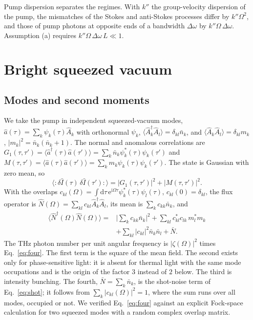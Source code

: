 \documentclass[aps,pra,reprint,superscriptaddress,amsmath,amssymb,floatfix]{revtex4-2}
\newcommand{\nbar}{\bar n}
\newcommand{\Nbar}{\bar N}
\newcommand{\Nop}{\hat N}
\newcommand{\Iop}{\hat I}
\newcommand{\dd}{\mathrm{d}}
\newcommand{\ee}{\mathrm{e}}
\newcommand{\ii}{\mathrm{i}}
\begin{document}
Pump dispersion separates the regimes. With $k''$ the group-velocity
dispersion of the pump, the mismatches of the Stokes and anti-Stokes
processes differ by $k''\Omega^2$, and those of pump photons at opposite ends
of a bandwidth $\Delta\omega$ by $k''\Omega\,\Delta\omega$. Assumption (a)
requires $k''\Omega\,\Delta\omega\,L\ll1$.

\section{Bright squeezed vacuum}
\label{sec:bsv}

\subsection{Modes and second moments}

We take the pump in independent squeezed-vacuum modes,
$\hat a(\tau)=\sum_k\psi_k(\tau)\hat A_k$ with orthonormal $\psi_k$,
$\langle\hat A_k^\dagger\hat A_l\rangle=\delta_{kl}\nbar_k$, and
$\langle\hat A_k\hat A_l\rangle=\delta_{kl}m_k$, $|m_k|^2=\nbar_k(\nbar_k+1)$.
The normal and anomalous correlations are
$G_1(\tau,\tau')=\langle\hat a^\dagger(\tau)\hat a(\tau')\rangle
=\sum_k\nbar_k\psi_k^*(\tau)\psi_k(\tau')$ and
$M(\tau,\tau')=\langle\hat a(\tau)\hat a(\tau')\rangle
=\sum_km_k\psi_k(\tau)\psi_k(\tau')$. The state is Gaussian with zero mean, so
\begin{equation}
\langle{:}\delta\Iop(\tau)\,\delta\Iop(\tau'){:}\rangle
=|G_1(\tau,\tau')|^2+|M(\tau,\tau')|^2 .
\label{eq:gmt}
\end{equation}
With the overlaps $c_{kl}(\Omega)=\int\!\dd\tau\,\ee^{\ii\Omega\tau}
\psi_k^*(\tau)\psi_l(\tau)$, $c_{kl}(0)=\delta_{kl}$, the flux operator is
$\Nop(\Omega)=\sum_{kl}c_{kl}\hat A_k^\dagger\hat A_l$, its mean is
$\sum_kc_{kk}\nbar_k$, and
\begin{align}
\langle\Nop^\dagger(\Omega)\Nop(\Omega)\rangle={}&
\Big|\sum_kc_{kk}\nbar_k\Big|^2
+\sum_{kl}c_{kl}^*c_{lk}\,m_l^*m_k\nonumber\\
&+\sum_{kl}|c_{kl}|^2\nbar_k\nbar_l+\Nbar .
\label{eq:four}
\end{align}
The THz photon number per unit angular frequency is $|\zeta(\Omega)|^2$ times
Eq.~\eqref{eq:four}. The first term is the square of the mean field. The
second exists only for phase-sensitive light: it is absent for thermal light
with the same mode occupations and is the origin of the factor $3$ instead of
$2$ below. The third is intensity bunching. The fourth,
$\Nbar=\sum_k\nbar_k$, is the shot-noise term of Eq.~\eqref{eq:shot}; it
follows from $\sum_k|c_{kl}(\Omega)|^2=1$, where the sum runs over all modes,
occupied or not. We verified Eq.~\eqref{eq:four} against an explicit
Fock-space calculation for two squeezed modes with a random complex overlap
matrix.
\end{document}
